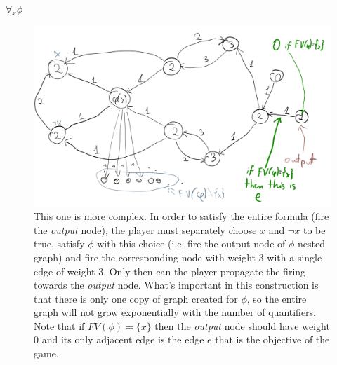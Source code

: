 \noindent
\underline{$\forall_{x} \phi$}
\begin{figure}[H]
      \centering
      \caption{
            This one is more complex. In order to satisfy the entire formula (fire the \textit{output} node),
            the player must separately choose $x$ and $\lnot x$ to be true, satisfy $\phi$ with this choice (i.e.
            fire the output node of $\phi$ nested graph) and fire the corresponding node with weight 3 with a single
            edge of weight 3. Only then can the player propagate the firing towards the \textit{output} node.
            What's important in this construction is that there is only one copy of graph created for $\phi$,
            so the entire graph will not grow exponentially with the number of quantifiers.
            Note that if $FV(\phi) = \{ x \}$ then the \textit{output} node should have weight 0 and its only
            adjacent edge is the edge $e$ that is the objective of the game.
      }
      \includegraphics[scale=0.2]{content/graphics/game12.png}
\end{figure}

